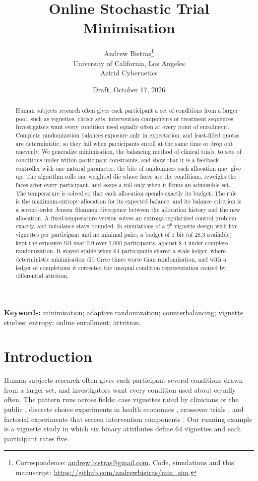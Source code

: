 \documentclass[11pt]{article}
\title{Online Stochastic Trial Minimisation}
\author{Andrew Bistras\thanks{Correspondence: \href{mailto:andrew.bistras@gmail.com}{andrew.bistras@gmail.com}. Code, simulations and this manuscript: \url{https://github.com/andrewbistras/min_sim}.}\\[4pt]
{\normalsize University of California, Los Angeles}\\
{\normalsize Astrid Cybernetics}}
\date{Draft, October 17, 2026}
\begin{document}
\maketitle

\begin{abstract}
\noindent Human subjects research often gives each participant a set of conditions from a larger pool, such as vignettes, choice sets, intervention components or treatment sequences. Investigators want every condition used equally often at every point of enrollment. Complete randomization balances exposure only in expectation, and least-filled quotas are deterministic, so they fail when participants enroll at the same time or drop out unevenly. We generalize minimisation, the balancing method of clinical trials, to sets of conditions under within-participant constraints, and show that it is a feedback controller with one natural parameter: the bits of randomness each allocation may give up. The algorithm rolls one weighted die whose faces are the conditions, reweighs the faces after every participant, and keeps a roll only when it forms an admissible set. The temperature is solved so that each allocation spends exactly its budget. The rule is the maximum-entropy allocation for its expected balance, and its balance criterion is a second-order Jensen--Shannon divergence between the allocation history and the new allocation. A fixed-temperature version solves an entropy-regularized control problem exactly, and imbalance stays bounded. In simulations of a $2^6$ vignette design with five vignettes per participant and no minimal pairs, a budget of 1 bit (of 28.3 available) kept the exposure SD near 0.9 over 1,000 participants, against 8.4 under complete randomization. It stayed stable when 64 participants shared a stale ledger, where deterministic minimisation did three times worse than randomization, and with a ledger of completions it corrected the unequal condition representation caused by differential attrition.
\end{abstract}

\noindent\textbf{Keywords:} minimisation; adaptive randomization; counterbalancing; vignette studies; entropy; online enrollment; attrition.

\section{Introduction}

Human subjects research often gives each participant several conditions drawn from a larger set, and investigators want every condition used about equally often. The pattern runs across fields: case vignettes rated by clinicians or the public \citep{peabody2000,auspurg2015}, discrete choice experiments in health economics \citep{johnson2013}, crossover trials \citep{senn2002}, and factorial experiments that screen intervention components \citep{collins2018}. Our running example is a vignette study in which six binary attributes define 64 vignettes and each participant rates five.
\end{document}
